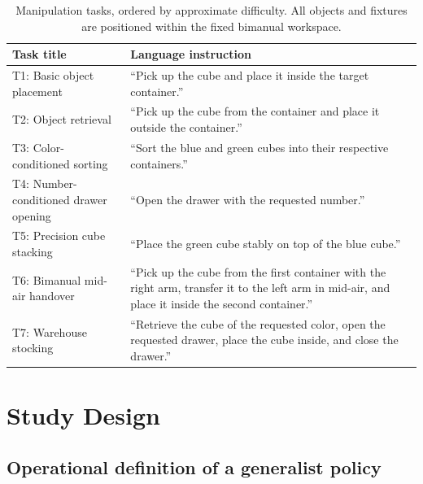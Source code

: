 \documentclass[10pt,conference]{IEEEtran}
\begin{document}
\begin{table}[t]
\centering
\small
\caption{Manipulation tasks, ordered by approximate difficulty. All objects and fixtures are positioned within the fixed bimanual workspace.}
\label{tab:tasks}
\begin{tabularx}{\textwidth}
{@{}p{}X@{}}
\toprule
\textbf{Task title} &
\textbf{Language instruction} \\
\midrule

T1: Basic object placement &
``Pick up the cube and place it inside the target container.'' \\

T2: Object retrieval &
``Pick up the cube from the container and place it outside the container.'' \\

T3: Color-conditioned sorting &
``Sort the blue and green cubes into their respective containers.'' \\

T4: Number-conditioned drawer opening &
``Open the drawer with the requested number.'' \\

T5: Precision cube stacking &
``Place the green cube stably on top of the blue cube.'' \\

T6: Bimanual mid-air handover &
``Pick up the cube from the first container with the right arm, transfer it to the
left arm in mid-air, and place it inside the second container.'' \\

T7: Warehouse stocking &
``Retrieve the cube of the requested color, open the requested drawer, place the cube inside, and close the drawer.'' \\

\bottomrule
\end{tabularx}
\end{table}

\section{Study Design}
\label{sec:study-design}

\subsection{Operational definition of a generalist policy}
\end{document}
